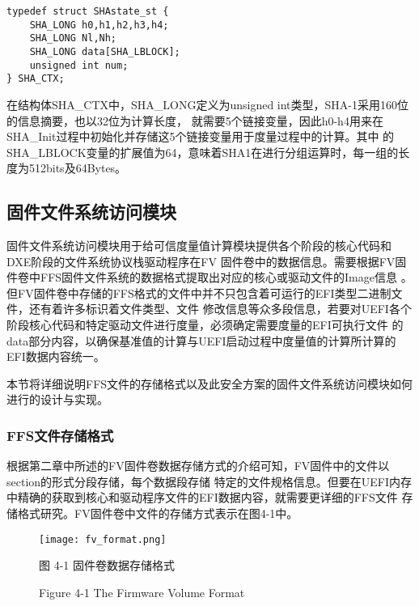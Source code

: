 \begin{lstlisting}
typedef struct SHAstate_st {
    SHA_LONG h0,h1,h2,h3,h4;
    SHA_LONG Nl,Nh;
    SHA_LONG data[SHA_LBLOCK];
    unsigned int num;
} SHA_CTX;
\end{lstlisting}

在结构体SHA\_CTX中，SHA\_LONG定义为unsigned int类型，SHA-1采用160位的信息摘要，也以32位为计算长度，
就需要5个链接变量，因此h0-h4用来在SHA\_Init过程中初始化并存储这5个链接变量用于度量过程中的计算。其中
的SHA\_LBLOCK变量的扩展值为64，意味着SHA1在进行分组运算时，每一组的长度为512bits及64Bytes。

\subsection{固件文件系统访问模块}
固件文件系统访问模块用于给可信度量值计算模块提供各个阶段的核心代码和DXE阶段的文件系统协议栈驱动程序在FV
固件卷中的数据信息。需要根据FV固件卷中FFS固件文件系统的数据格式提取出对应的核心或驱动文件的Image信息
\cite{english2}。
但FV固件卷中存储的FFS格式的文件中并不只包含着可运行的EFI类型二进制文件，还有着许多标识着文件类型、文件
修改信息等众多段信息，若要对UEFI各个阶段核心代码和特定驱动文件进行度量，必须确定需要度量的EFI可执行文件
的data部分内容，以确保基准值的计算与UEFI启动过程中度量值的计算所计算的EFI数据内容统一。
\par 本节将详细说明FFS文件的存储格式以及此安全方案的固件文件系统访问模块如何进行的设计与实现。

\subsubsection{FFS文件存储格式}
根据第二章中所述的FV固件卷数据存储方式的介绍可知，FV固件中的文件以section的形式分段存储，每个数据段存储
特定的文件规格信息。但要在UEFI内存中精确的获取到核心和驱动程序文件的EFI数据内容，就需要更详细的FFS文件
存储格式研究。FV固件卷中文件的存储方式表示在图4-1中。

\begin{figure}[htb]
    \label{ffs_format}
    \vspace{0cm}   
    \setlength{\abovecaptionskip}{0.3cm}
	\centering
    \texttt{[image: fv\_format.png]}
    \caption*{图 4-1 固件卷数据存储格式}
    \setlength{\belowcaptionskip}{-0.7cm}
    \caption*{Figure 4-1 The Firmware Volume Format}
\end{figure}

